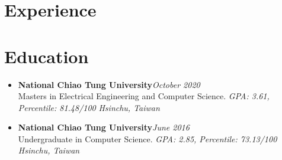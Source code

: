 \section{Experience}
\fi
\section{\sectionheading Education}

\begin{itemize}[leftmargin=0pt, label={}]%

\item{
{\sectionheading\large{\textbf{National Chiao Tung University}}}\hfill {\sectionheading\small{\textit{October 2020}}}\\
{\sectionheading\small{Masters in Electrical Engineering and Computer Science.}}
{\sectionheading\small{\textit{GPA: 3.61, Percentile: 81.48/100}}}
\hfill{\sectionheading\small{\textit{Hsinchu, Taiwan}}}

}
\item{
{\sectionheading\large{\textbf{National Chiao Tung University}}}\hfill {\sectionheading\small{\textit{June 2016}}}\\
{\sectionheading\small{Undergraduate in Computer Science.}}
{\sectionheading\small{\textit{GPA: 2.85, Percentile: 73.13/100}}}
\hfill{\sectionheading\small{\textit{Hsinchu, Taiwan}}}

}

\end{itemize}
